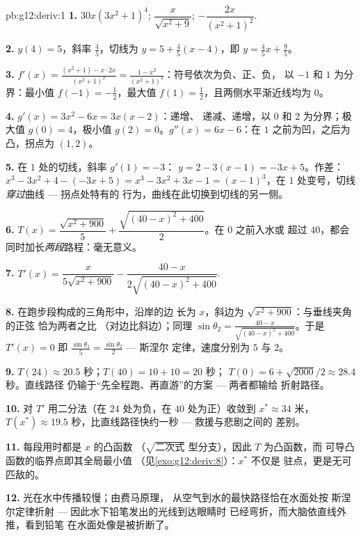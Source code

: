 \begin{solution}{pb:g12:deriv:1}
\textbf{1.} $30x\left(3x^2 + 1\right)^4$; \quad
$\dfrac{x}{\sqrt{x^2 + 9}}$; \quad
$-\dfrac{2x}{\left(x^2 + 1\right)^2}$.

\textbf{2.} $y(4) = 5$，斜率 $\frac45$，切线为
$y = 5 + \frac45(x - 4)$，即 $y = \frac45 x + \frac95$。

\textbf{3.} $f'(x) = \frac{(x^2 + 1) - x \cdot 2x}{(x^2+1)^2}
= \frac{1 - x^2}{(x^2 + 1)^2}$：符号依次为负、正、负，
以 $-1$ 和 $1$ 为分界：最小值 $f(-1) = -\frac12$，最大值
$f(1) = \frac12$，且两侧水平渐近线均为 $0$。

\textbf{4.} $g'(x) = 3x^2 - 6x = 3x(x - 2)$：递增、
递减、递增，以 $0$ 和 $2$ 为分界；极大值
$g(0) = 4$，极小值 $g(2) = 0$。$g''(x) = 6x - 6$：在
$1$ 之前为凹，之后为凸，拐点为 $(1, 2)$。

\textbf{5.} 在 $1$ 处的切线，斜率 $g'(1) = -3$：
$y = 2 - 3(x - 1) = -3x + 5$。作差：
$x^3 - 3x^2 + 4 - (-3x + 5) = x^3 - 3x^2 + 3x - 1 =
(x - 1)^3$，在 $1$ 处变号，切线
\emph{穿过}曲线 --- 拐点处特有的
行为，曲线在此切换到切线的另一侧。

\textbf{6.} $T(x) = \dfrac{\sqrt{x^2 + 900}}{5} +
\dfrac{\sqrt{(40 - x)^2 + 400}}{2}$。在 $0$ 之前入水或
超过 $40$，都会同时加长\emph{两段}路程：毫无意义。

\textbf{7.} $T'(x) = \dfrac{x}{5\sqrt{x^2 + 900}} -
\dfrac{40 - x}{2\sqrt{(40 - x)^2 + 400}}$.

\textbf{8.} 在跑步段构成的三角形中，沿岸的边
长为 $x$，斜边为 $\sqrt{x^2 + 900}$：与垂线夹角的正弦
恰为两者之比
（对边比斜边）；同理
$\sin\theta_2 = \frac{40 - x}{\sqrt{(40-x)^2 + 400}}$。于是
$T'(x) = 0$ 即
$\frac{\sin\theta_1}{5} = \frac{\sin\theta_2}{2}$ --- 斯涅尔
定律，速度分别为 $5$ 与 $2$。

\textbf{9.} $T(24) \approx 20.5$ 秒；$T(40) = 10 + 10 = 20$ 秒；
$T(0) = 6 + \sqrt{2000}/2 \approx 28.4$ 秒。直线路径
仍输于“先全程跑、再直游”的方案 --- 两者都输给
折射路径。

\textbf{10.} 对 $T'$ 用二分法（在 $24$ 处为负，在
$40$ 处为正）收敛到 $x^* \approx 34$ 米，
$T(x^*) \approx 19.5$ 秒，比直线路径快约一秒 ---
救援与悲剧之间的
差别。

\textbf{11.} 每段用时都是 $x$ 的凸函数
（$\sqrt{\text{二次式}}$ 型分支），因此 $T$ 为凸函数，而
可导凸函数的临界点即其全局最小值
（见\cref{exo:g12:deriv:8}）：$x^*$ 不仅是
驻点，更是无可匹敌的。

\textbf{12.} 光在水中传播较慢；由费马原理，
从空气到水的最快路径恰在水面处按
斯涅尔定律折射 --- 因此水下铅笔发出的光线到达眼睛时
已经弯折，而大脑依直线外推，看到铅笔
在水面处像是被折断了。


\end{solution}
